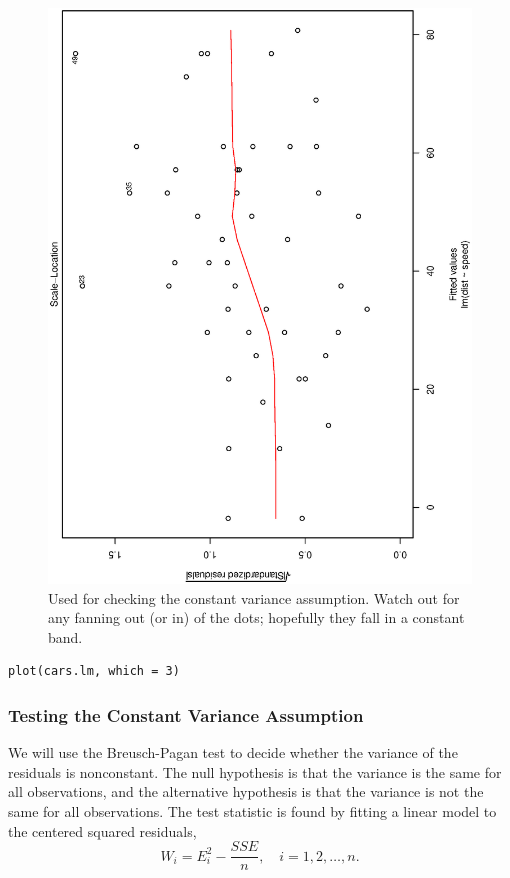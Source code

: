 \documentclass[captions=tableheading]{scrbook}
\begin{document}
\begin{figure}[th]
  \includegraphics[angle=270, totalheight=4in]{ps/slr/std-resids-fitted-cars.ps}
  \caption[Plot of standardized residuals against the fitted values for the \texttt{cars} data]{\small Used for checking the constant variance assumption. Watch out for any fanning out (or in) of the dots; hopefully they fall in a constant band.}
  \label{fig-std-resids-fitted-cars}
\end{figure}



\begin{verbatim}
plot(cars.lm, which = 3)
\end{verbatim}
\subsubsection{Testing the Constant Variance Assumption}
\label{sec-11-4-2-1}


We will use the Breusch-Pagan test to decide whether the variance of the residuals is nonconstant. The null hypothesis is that the variance is the same for all observations, and the alternative hypothesis is that the variance is not the same for all observations. The test statistic is found by fitting a linear model to the centered squared residuals,
\begin{equation}
W_{i} = E_{i}^{2} - \frac{SSE}{n}, \quad i=1,2,\ldots,n.
\end{equation}
\end{document}
